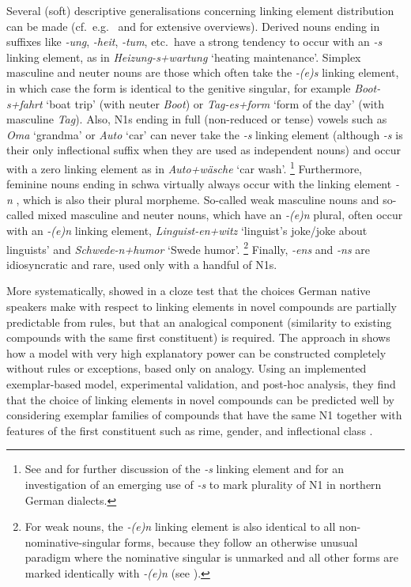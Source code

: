 Several (soft) descriptive generalisations concerning linking element distribution can be made (cf.\ e.g.\ \citealt{Fuhrhop1996} and \citealt{NueblingSzczepaniak2013} for extensive overviews).
Derived nouns ending in suffixes like \textit{-ung}, \textit{-heit}, \textit{-tum}, etc.\ have a strong tendency to occur with an \textit{-s} linking element, as in \textit{Heizung-s+wartung} `heating maintenance'.
Simplex masculine and neuter nouns are those which often take the \textit{-(e)s} linking element, in which case the form is identical to the genitive singular, for example \textit{Boot-s+fahrt} `boat trip' (with neuter \textit{Boot}) or \textit{Tag-es+form} `form of the day' (with masculine \textit{Tag}).
Also, N1s ending in full (non-reduced or tense) vowels such as \textit{Oma} `grandma' or \textit{Auto} `car' can never take the \textit{-s} linking element (although \textit{-s} is their only inflectional suffix when they are used as independent nouns) and occur with a zero linking element as in \textit{Auto+wäsche} `car wash'.%
\footnote{See \textcite{Wegener2003, Wegener2005} and \textcite{FuhrhopKuerschner2015} for further discussion of the \textit{-s} linking element and \textcite{Fehringer2009} for an investigation of an emerging use of \textit{-s} to mark plurality of N1 in northern German dialects.}
Furthermore, feminine nouns ending in schwa virtually always occur with the linking element \textit{-n} \parencite[32]{LibbenEa2002}, which is also their plural morpheme.
So-called weak masculine nouns and so-called mixed masculine and neuter nouns, which have an \textit{-(e)n} plural, often occur with an \textit{-(e)n} linking element, \egg \textit{Linguist-en+witz} `linguist's joke\slash joke about linguists' and \textit{Schwede-n+humor} `Swede humor'.%
\footnote{For weak nouns, the \textit{-(e)n} linking element is also identical to all non-nominative-singular forms, because they follow an otherwise unusual paradigm where the nominative singular is unmarked and all other forms are marked identically with \textit{-(e)n} (see \citealt{Koepcke1995,Schaefer2016c}).}
Finally, \textit{-ens} and \textit{-ns} are idiosyncratic and rare, used only with a handful of N1s.

More systematically, \textcite{DresslerEa2001} showed in a cloze test that the choices German native speakers make with respect to linking elements in novel compounds are partially predictable from rules, but that an analogical component (similarity to existing compounds with the same first constituent) is required.
The approach in \textcite{KrottEa2007} shows how a model with very high explanatory power can be constructed completely without rules or exceptions, based only on analogy.
Using an implemented exemplar-based model, experimental validation, and post-hoc analysis, they find that the choice of linking elements in novel compounds can be predicted well by considering exemplar families of compounds that have the same N1 together with features of the first constituent such as rime, gender, and inflectional class \parencite[47]{KrottEa2007}.

